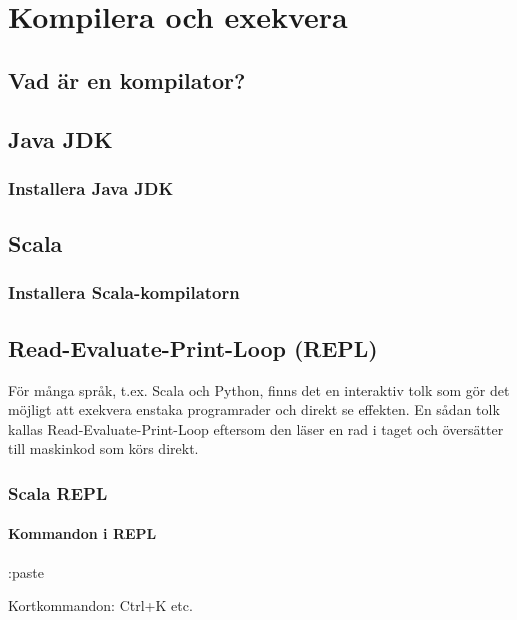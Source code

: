 
\chapter{Kompilera och exekvera}\label{appendix:compile}
\section{Vad är en kompilator?}
\section{Java JDK}
\subsection{Installera Java JDK}
\section{Scala}
\subsection{Installera Scala-kompilatorn}
\section{Read-Evaluate-Print-Loop (REPL)}
För många språk, t.ex. Scala och Python, finns det en interaktiv tolk som gör det möjligt att exekvera enstaka programrader och direkt se effekten. En sådan tolk kallas Read-Evaluate-Print-Loop eftersom den läser en rad i taget och översätter till maskinkod som körs direkt.    
\subsection{Scala REPL}
\subsubsection{Kommandon i REPL}
:paste

Kortkommandon: Ctrl+K etc.